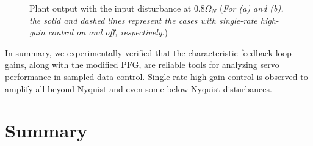 \documentclass [11pt, proquest] {uwthesis}[2020/02/24]
\begin{document}
\begin{figure}[!ht]
\begin{centering}
{\begin{centering}
\par\end{centering}
}
\par\end{centering}
\begin{centering}
\par\end{centering}
\caption{\label{fig:Plant-output-for-5}Plant output with the input disturbance
at $0.8\Omega_{N}$ (\emph{For (a) and (b), the solid and dashed lines
represent the cases with single-rate high-gain control on and off,
respectively}.)}
\end{figure}

In summary, we experimentally verified that the characteristic feedback
loop gains, along with the modified PFG, are reliable tools for analyzing
servo performance in sampled-data control. Single-rate high-gain control
is observed to amplify all beyond-Nyquist and even some below-Nyquist
disturbances. 

\section{Summary}
\end{document}
